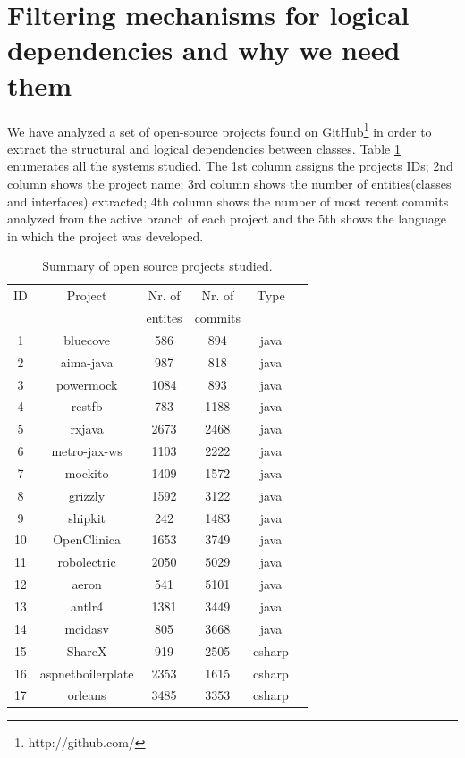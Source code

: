 \documentclass[conference]{IEEEtran}
\begin{document}
\section{Filtering mechanisms for logical dependencies and why we need them}
\label{sec:results}


We have analyzed a set of open-source projects found on GitHub\footnote{http://github.com/} \cite{Kalliamvakou2016} in order to extract the structural and logical dependencies between classes. Table \ref{table:1} enumerates all the systems studied. The 1st column assigns the projects IDs; 2nd column shows the project name; 3rd column shows the number of entities(classes and interfaces) extracted; 4th column shows the number of most recent commits analyzed from the active branch of each project and the 5th shows the language in which the project was developed.
\begin{table}[!h]
\renewcommand{\arraystretch}{1.25}
\caption{Summary of open source projects studied.}
\label{table:1}
\centering
\begin{tabular}{|c|c|c|c|c|c|}
\hline
   ID  & Project    & Nr. of & Nr. of& Type\\
     &     & entites & commits & \\
\hline
1	&	bluecove	&	586	&	894	&	java	\\
2	&	aima-java	&	987	&	818	&	java	\\
3	&	powermock	&	1084	&	893	&	java	\\
4	&	restfb	&	783	&	1188	&	java	\\
5	&	rxjava	&	2673	&	2468	&	java	\\
6	&	metro-jax-ws	&	1103	&	2222	&	java	\\
7	&	mockito	&	1409	&	1572	&	java	\\
8	&	grizzly	&	1592	&	3122	&	java	\\
9	&	shipkit	&	242	&	1483	&	java	\\
10	&	OpenClinica	&	1653	&	3749	&	java	\\
11	&	robolectric	&	2050	&	5029	&	java	\\
12	&	aeron	&	541	&	5101	&	java	\\
13	&	antlr4	&	1381	&	3449	&	java	\\
14	&	mcidasv	&	805	&	3668	&	java	\\
15	&	ShareX	&	919	&	2505	&	csharp	\\
16	&	aspnetboilerplate	&	2353	&	1615	&	csharp	\\
17	&	orleans	&	3485	&	3353	&	csharp	\\

\end{tabular}
\end{table}
\end{document}
